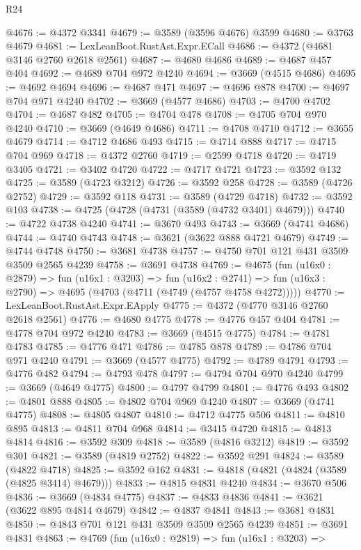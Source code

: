 \begin{lexlean}{R24}
\begin{coremodule}
@4676 := @4372 @3341
@4679 := @3589 (@3596 @4676) @3599
@4680 := @3763 @4679
@4681 := LexLeanBoot.RustAst.Expr.ECall
@4686 := @4372 (@4681 @3146 @2760 @2618 @2561)
@4687 := @4680 @4686
@4689 := @4687 @457 @404
@4692 := @4689 @704 @972 @4240
@4694 := @3669 (@4515 @4686)
@4695 := @4692 @4694
@4696 := @4687 @471
@4697 := @4696 @878
@4700 := @4697 @704 @971 @4240
@4702 := @3669 (@4577 @4686)
@4703 := @4700 @4702
@4704 := @4687 @482
@4705 := @4704 @478
@4708 := @4705 @704 @970 @4240
@4710 := @3669 (@4649 @4686)
@4711 := @4708 @4710
@4712 := @3655 @4679
@4714 := @4712 @4686 @493
@4715 := @4714 @888
@4717 := @4715 @704 @969
@4718 := @4372 @2760
@4719 := @2599 @4718
@4720 := @4719 @3405
@4721 := @3402 @4720
@4722 := @4717 @4721
@4723 := @3592 @132
@4725 := @3589 (@4723 @3212)
@4726 := @3592 @258
@4728 := @3589 (@4726 @2752)
@4729 := @3592 @118
@4731 := @3589 (@4729 @4718)
@4732 := @3592 @103
@4738 := @4725 (@4728 (@4731 (@3589 (@4732 @3401) @4679)))
@4740 := @4722 @4738 @4240
@4741 := @3670 @493
@4743 := @3669 (@4741 @4686)
@4744 := @4740 @4743
@4748 := @3621 (@3622 @888 @4721 @4679)
@4749 := @4744 @4748
@4750 := @3681 @4738
@4757 := @4750 @701 @121 @431 @3509 @3509 @2565 @4239
@4758 := @3691 @4738
@4769 := @4675
    (fun (u16x0 : @2879) =>
    fun (u16x1 : @3203) =>
    fun (u16x2 : @2741) => fun (u16x3 : @2790) => @4695 (@4703 (@4711 (@4749 (@4757 @4758 @4272)))))
@4770 := LexLeanBoot.RustAst.Expr.EApply
@4775 := @4372 (@4770 @3146 @2760 @2618 @2561)
@4776 := @4680 @4775
@4778 := @4776 @457 @404
@4781 := @4778 @704 @972 @4240
@4783 := @3669 (@4515 @4775)
@4784 := @4781 @4783
@4785 := @4776 @471
@4786 := @4785 @878
@4789 := @4786 @704 @971 @4240
@4791 := @3669 (@4577 @4775)
@4792 := @4789 @4791
@4793 := @4776 @482
@4794 := @4793 @478
@4797 := @4794 @704 @970 @4240
@4799 := @3669 (@4649 @4775)
@4800 := @4797 @4799
@4801 := @4776 @493
@4802 := @4801 @888
@4805 := @4802 @704 @969 @4240
@4807 := @3669 (@4741 @4775)
@4808 := @4805 @4807
@4810 := @4712 @4775 @506
@4811 := @4810 @895
@4813 := @4811 @704 @968
@4814 := @3415 @4720
@4815 := @4813 @4814
@4816 := @3592 @309
@4818 := @3589 (@4816 @3212)
@4819 := @3592 @301
@4821 := @3589 (@4819 @2752)
@4822 := @3592 @291
@4824 := @3589 (@4822 @4718)
@4825 := @3592 @162
@4831 := @4818 (@4821 (@4824 (@3589 (@4825 @3414) @4679)))
@4833 := @4815 @4831 @4240
@4834 := @3670 @506
@4836 := @3669 (@4834 @4775)
@4837 := @4833 @4836
@4841 := @3621 (@3622 @895 @4814 @4679)
@4842 := @4837 @4841
@4843 := @3681 @4831
@4850 := @4843 @701 @121 @431 @3509 @3509 @2565 @4239
@4851 := @3691 @4831
@4863 := @4769
    (fun (u16x0 : @2819) =>
    fun (u16x1 : @3203) =>

\end{coremodule}
\end{lexlean}
